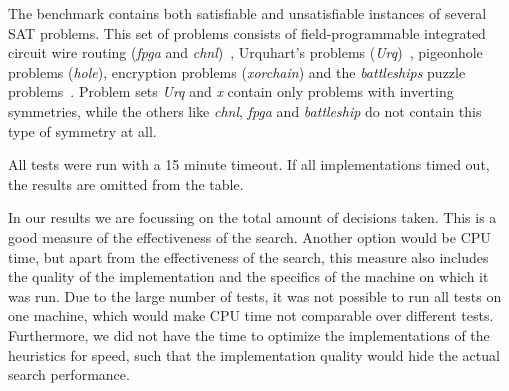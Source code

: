	The benchmark contains both satisfiable and unsatisfiable instances of several SAT problems.
	This set of problems consists of field-programmable integrated circuit wire routing (\emph{fpga} and
	\emph{chnl})~\cite{nam2004comparative}, Urquhart's problems (\emph{Urq})~\cite{urquhart1987hard},
	pigeonhole problems (\emph{hole}), encryption problems (\emph{xorchain}) and the \emph{battleships}
	puzzle problems~\cite{sevenster2004battleships}.
	Problem sets \emph{Urq} and \emph{x} contain only problems with inverting symmetries, while the
	others like \emph{chnl}, \emph{fpga} and \emph{battleship} do not contain this type of symmetry
	at all\cite{devriendt2012symmetry}.

	All tests were run with a 15 minute timeout.
	If all implementations timed out, the results are omitted from the table.

	In our results we are focussing on the total amount of decisions taken.
	This is a good measure of the effectiveness of the search.
	Another option would be CPU time, but apart from the effectiveness of the search, this measure
	also includes the quality of the implementation and the specifics of the machine on which it was
	run.
	Due to the large number of tests, it was not possible to run all tests on one machine, which
	would make CPU time not comparable over different tests.
	Furthermore, we did not have the time to optimize the implementations of the heuristics for
	speed, such that the implementation quality would hide the actual search performance.
